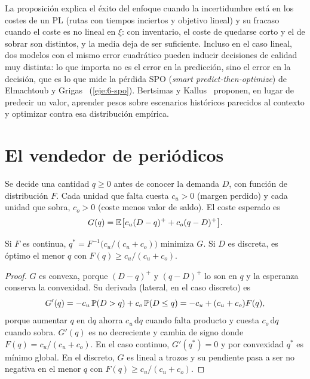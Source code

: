 La proposición explica el éxito del enfoque cuando la incertidumbre está en los costes de un PL (rutas con tiempos inciertos y objetivo lineal) y su fracaso cuando el coste es no lineal en $\xi$: con inventario, el coste de quedarse corto y el de sobrar son distintos, y la media deja de ser suficiente. Incluso en el caso lineal, dos modelos con el mismo error cuadrático pueden inducir decisiones de calidad muy distinta: lo que importa no es el error en la predicción, sino el error en la decisión, que es lo que mide la pérdida SPO (\emph{smart predict-then-optimize}) de Elmachtoub y Grigas~\cite{spo} (\cref{eje:6-spo}). Bertsimas y Kallus~\cite{bk} proponen, en lugar de predecir un valor, aprender pesos sobre escenarios históricos parecidos al contexto y optimizar contra esa distribución empírica.

\section{El vendedor de periódicos}

\begin{definicion}\label{def:newsvendor}
Se decide una cantidad $q\ge 0$ antes de conocer la demanda $D$, con función de distribución $F$. Cada unidad que falta cuesta $c_u>0$ (margen perdido) y cada unidad que sobra, $c_o>0$ (coste menos valor de saldo). El coste esperado es
\[
G(q)=\mathbb{E}\bigl[c_u(D-q)^{+}+c_o(q-D)^{+}\bigr].
\]
\end{definicion}

\begin{teorema}\label{teo:fractil}
Si $F$ es continua, $q^{*}=F^{-1}\!\bigl(c_u/(c_u+c_o)\bigr)$ minimiza $G$. Si $D$ es discreta, es óptimo el menor $q$ con $F(q)\ge c_u/(c_u+c_o)$.
\end{teorema}

\begin{proof}
$G$ es convexa, porque $(D-q)^{+}$ y $(q-D)^{+}$ lo son en $q$ y la esperanza conserva la convexidad. Su derivada (lateral, en el caso discreto) es
\[
G'(q)=-c_u\,\mathbb{P}(D>q)+c_o\,\mathbb{P}(D\le q)=-c_u+(c_u+c_o)F(q),
\]
porque aumentar $q$ en $\mathrm{d}q$ ahorra $c_u\,\mathrm{d}q$ cuando falta producto y cuesta $c_o\,\mathrm{d}q$ cuando sobra. $G'(q)$ es no decreciente y cambia de signo donde $F(q)=c_u/(c_u+c_o)$. En el caso continuo, $G'(q^{*})=0$ y por convexidad $q^{*}$ es mínimo global. En el discreto, $G$ es lineal a trozos y su pendiente pasa a ser no negativa en el menor $q$ con $F(q)\ge c_u/(c_u+c_o)$.
\end{proof}

